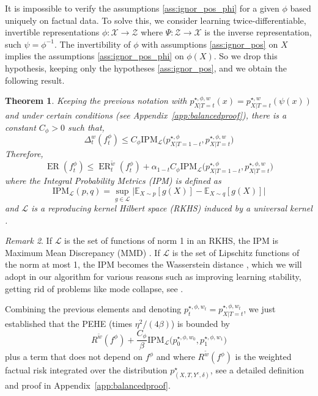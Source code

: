 \documentclass[12pt]{article}
\theoremstyle{plain}
\newtheorem{theorem}{Theorem}[section]
\theoremstyle{definition}
\theoremstyle{remark}
\newtheorem{remark}[theorem]{Remark}
\DeclareMathOperator{\ER}{\text{ER}}
\begin{document}
It is impossible to verify the assumptions \ref{ass:ignor_pos_phi} for a given $\phi$ based uniquely on factual data. To solve this, we consider learning twice-differentiable, invertible representations $\phi: \mathcal{X} \to \mathcal{Z}$ where $\Psi: \mathcal{Z} \to \mathcal{X}$ is the inverse representation, such $\psi=\phi^{-1}$. The invertibility of $\phi$ with assumptions \ref{ass:ignor_pos}  on $X$  implies the assumptions \ref{ass:ignor_pos_phi} on $\phi(X)$. So we drop this hypothesis, keeping only the hypotheses \ref{ass:ignor_pos},  and we obtain the following result.

\begin{theorem}
\label{thm:bound}
Keeping the previous notation with $p^{\star,\phi,w}_{X | T=t}(x)=p^{\star,w}_{X | T=t}(\psi(x))$ and under certain conditions (see Appendix~\ref{app:balancedproof}), there is a constant $C_{\phi }>0$ such that,
\begin{equation*}
    \Delta _{t}^w( f_{t}^\phi) \leq C_{\phi }  \text{IPM}_{\mathcal{L}}\Big(  p^{\star,\phi}_{X | T=1-t} ,p^{\star,\phi,w}_{X | T=t}\Big)
\end{equation*}
 Therefore,
\begin{equation*}
\ER( f _{t}^\phi) \leq \ER^{\tilde{w}}_{t}(f _{t}^\phi) +\alpha _{1-t}  C_{\phi }  \text{IPM}_{\mathcal{L}}\Big(  p^{\star,\phi}_{X | T=1-t} ,p^{\star,\phi,w}_{X | T=t}\Big)
\end{equation*}
where the Integral Probability Metrics (IPM) \cite{Mller1997IntegralPM} is defined as 
\begin{equation*}
    \text{IPM}_{\mathcal{L}}(p,q)=\sup _{g\in \mathcal{L}}\Big| \mathbb{E}_{X\sim p}[ g( X)] -\mathbb{E}_{X \sim q}[ g( X)]  \Big|
\end{equation*} 
and  $\mathcal{L}$ is a reproducing kernel Hilbert space (RKHS) induced by a universal kernel \cite{Gretton2012ATest}.
\end{theorem}
\begin{remark}
If $\mathcal{L}$ is the set of functions of norm 1 in an RKHS, the IPM is Maximum Mean Discrepancy (MMD) \cite{Gretton2012ATest}. If $\mathcal{L}$ is the set of Lipschitz functions of the norm at most 1, the IPM becomes the Wasserstein distance \cite{Villani2007OptimalNew}, which we will adopt in our algorithm for various reasons such as improving learning stability, getting rid of problems like mode collapse, see \cite{Arjovsky2017WassersteinG, Pinetz2019OnTE}.
\end{remark}
Combining the previous elements and denoting $p^{\star,\phi,w_t}_t=p^{\star,\phi,w_t}_{X | T=t}$, we just established that the PEHE (times $\eta^2/(4\beta)$) is bounded by
\begin{equation}\label{eq:boundExpectPEHE}
    R^{\tilde{w}}(f^\phi)   +  \frac{C_{\phi}}{\beta}   \text{IPM}_{\mathcal{L}}\big(  p^{\star,\phi,w_0}_{0}, p^{\star,\phi,w_1}_{1}\big)
\end{equation}
plus a term that does not depend on $f^\phi$ and
 where $R^{\tilde{w}}(f^\phi)$ is the weighted factual risk integrated over the distribution $p^\star_{(X,T,Y^c,\delta)}$, see a detailed definition and proof in Appendix~\ref{app:balancedproof}.
\end{document}
